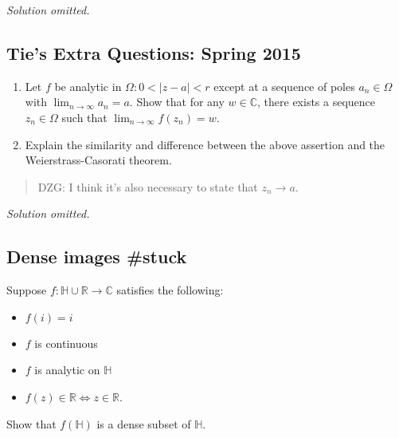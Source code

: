 \emph{Solution omitted.}

\hypertarget{ties-extra-questions-spring-2015-8}{%
\subsection{Tie's Extra Questions: Spring
2015}\label{ties-extra-questions-spring-2015-8}}

\begin{problem}[?]

\begin{enumerate}
\def\labelenumi{\arabic{enumi}.}
\item
  Let \(f\) be analytic in \(\Omega: 0<|z-a|<r\) except at a sequence of
  poles \(a_n \in \Omega\) with \(\lim_{n \rightarrow \infty} a_n = a\).
  Show that for any \(w \in \mathbb C\), there exists a sequence
  \(z_n \in \Omega\) such that
  \(\lim_{n \rightarrow \infty} f(z_n) = w\).
\item
  Explain the similarity and difference between the above assertion and
  the Weierstrass-Casorati theorem.
\end{enumerate}

\begin{quote}
DZG: I think it's also necessary to state that \(z_n \to a\).
\end{quote}

\end{problem}

\emph{Solution omitted.}

\hypertarget{dense-images-stuck}{%
\subsection{Dense images \#stuck}\label{dense-images-stuck}}

\begin{problem}[?]

Suppose \(f: {\mathbb{H}}\cup{\mathbb{R}}\to {\mathbb{C}}\) satisfies
the following:

\begin{itemize}
\tightlist
\item
  \(f(i) = i\)
\item
  \(f\) is continuous
\item
  \(f\) is analytic on \({\mathbb{H}}\)
\item
  \(f(z) \in {\mathbb{R}}\iff z\in {\mathbb{R}}\).
\end{itemize}

Show that \(f({\mathbb{H}})\) is a dense subset of \({\mathbb{H}}\).

\end{problem}

